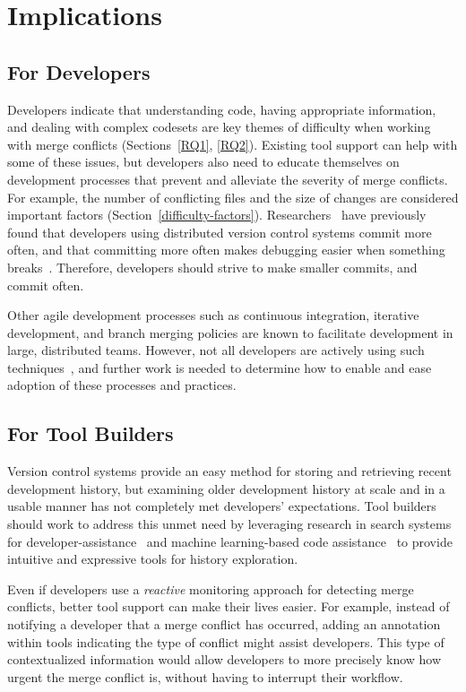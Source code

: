 \section{Implications}\label{implications}

\subsection{For Developers}
Developers indicate that understanding code, having appropriate information, and dealing with complex codesets are key themes of difficulty when working with merge conflicts (Sections~\ref{RQ1}, \ref{RQ2}).
Existing tool support can help with some of these issues, but developers also need to educate themselves on development processes that prevent and alleviate the severity of merge conflicts. 
For example, the number of conflicting files and the size of changes are considered important factors (Section~\ref{difficulty-factors}).
Researchers~\cite{brindescu2014versioncontrol} have previously found that developers using distributed version control systems commit more often, and that committing more often makes debugging easier when something breaks~\cite{meyer2014continuous}.
Therefore, developers should strive to make smaller commits, and commit often.

Other agile development processes such as continuous integration, iterative development, and branch merging policies are known to facilitate development in large, distributed teams. 
However, not all developers are actively using such techniques~\cite{phillips2011branching}, and further work is needed to determine how to enable and ease adoption of these processes and practices.

\subsection{For Tool Builders}
Version control systems provide an easy method for storing and retrieving recent development history, but examining older development history at scale and in a usable manner has not completely met developers' expectations.
Tool builders should work to address this unmet need by leveraging research in search systems for developer-assistance~\cite{nabi2016putting} and machine learning-based code assistance~\cite{bradley2011history_exploration} to provide intuitive and expressive tools for history exploration.

Even if developers use a \emph{reactive} monitoring approach for detecting merge conflicts, better tool support can make their lives easier.
For example, instead of notifying a developer that a merge conflict has occurred, adding an annotation within tools indicating the type of conflict might assist developers.
This type of contextualized information would allow developers to more precisely know how urgent the merge conflict is, without having to interrupt their workflow.

